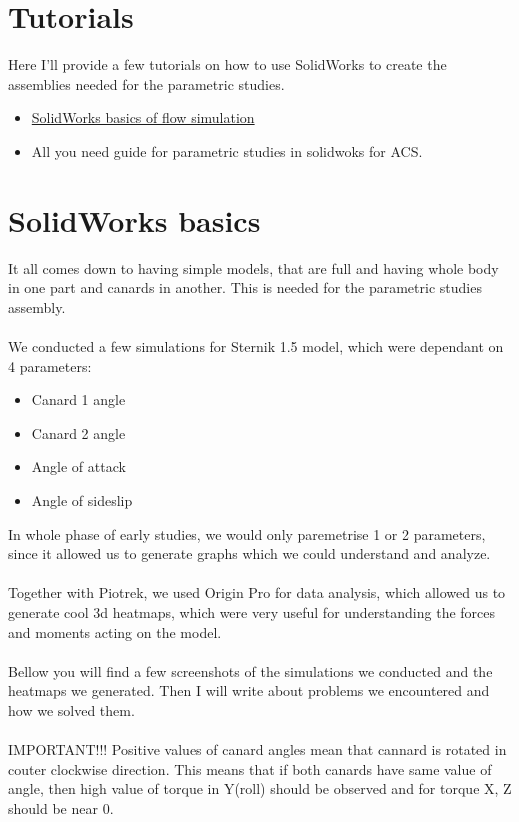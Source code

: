 \section{Tutorials}
Here I'll provide a few tutorials on how to use SolidWorks to create the assemblies needed for 
the parametric studies.

\begin{itemize}
    \item \href{https://youtu.be/PvouSPWoutg?si=g4lY9noGS2_bfpGE}{SolidWorks basics of flow simulation}
    \item All you need guide for parametric studies in solidwoks for ACS.
\end{itemize}

\section{SolidWorks basics}
It all comes down to having simple models, that are full and having whole body in one part and 
canards in another. This is needed for the parametric studies assembly. \\\\
We conducted a few simulations for Sternik 1.5 model, which were dependant on 4 parameters:
\begin{itemize}
    \item Canard 1 angle
    \item Canard 2 angle
    \item Angle of attack
    \item Angle of sideslip
\end{itemize}
In whole phase of early studies, we would only paremetrise 1 or 2 parameters, since 
it allowed us to generate graphs which we could understand and analyze. \\\\
Together with Piotrek, we used Origin Pro for data analysis, which allowed us to generate cool 3d
heatmaps, which were very useful for understanding the forces and moments acting on the model. \\\\
Bellow you will find a few screenshots of the simulations we conducted and the heatmaps we generated.
Then I will write about problems we encountered and how we solved them.\\\\
IMPORTANT!!! Positive values of canard angles mean that cannard is rotated in couter clockwise 
direction. This means that if both canards have same value of angle, then high value of 
torque in Y(roll) should be observed and for torque X, Z should be near 0. \\\\

